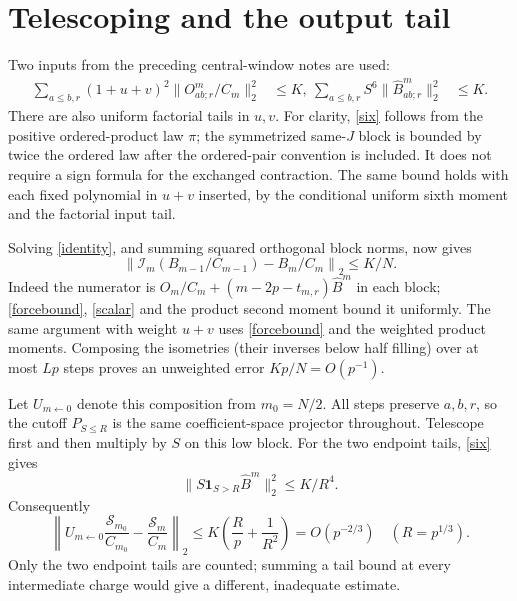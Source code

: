 \documentclass[11pt,a4paper]{article}
\newcommand{\Id}{\mathcal I}
\begin{document}
\newpage
\section{Telescoping and the output tail}
Two inputs from the preceding central-window notes are used:
\begin{align}
 \sum_{a\le b,r}(1+u+v)^2\|O^m_{ab;r}/C_m\|_2^2&\le K,\label{forcebound}\
 \sum_{a\le b,r}S^6\|\widehat B^m_{ab;r}\|_2^2&\le K.\label{six}
\end{align}
There are also uniform factorial tails in $u,v$. For clarity,
\eqref{six} follows from the positive ordered-product law $\pi$;
the symmetrized same-$J$ block is bounded by twice the ordered
law after the ordered-pair convention is included. It does not
require a sign formula for the exchanged contraction. The same
bound holds with each fixed polynomial in $u+v$ inserted, by the
conditional uniform sixth moment and the factorial input tail.

Solving \eqref{identity}, and summing squared orthogonal block norms,
now gives
\begin{equation}
 \left\|\Id_m(B_{m-1}/C_{m-1})-B_m/C_m\right\|_2\le K/N.
 \label{step}
\end{equation}
Indeed the numerator is $O_m/C_m+(m-2p-t_{m,r})\widehat B^m$
in each block; \eqref{forcebound}, \eqref{scalar} and the product
second moment bound it uniformly. The same argument with weight
$u+v$ uses \eqref{forcebound} and the weighted product moments.
Composing the isometries (their inverses below half filling) over
at most $Lp$ steps proves an unweighted error $Kp/N=O(p^{-1})$.

Let $U_{m\leftarrow0}$ denote this composition from $m_0=N/2$.
All steps preserve $a,b,r$, so the cutoff $P_{S\le R}$ is the same
coefficient-space projector throughout. Telescope first and then
multiply by $S$ on this low block. For the two endpoint tails,
\eqref{six} gives
\begin{equation}
 \|S\mathbf1_{S>R}\widehat B^m\|_2^2\le K/R^4.
\end{equation}
Consequently
\begin{equation}
 \left\|U_{m\leftarrow0}\frac{\mathcal S_{m_0}}{C_{m_0}}
                   -\frac{\mathcal S_m}{C_m}\right\|_2
 \le K\left(\frac R p+\frac1{R^2}\right)
 =O(p^{-2/3})\quad(R=p^{1/3}).\label{transport}
\end{equation}
Only the two endpoint tails are counted; summing a tail bound at
every intermediate charge would give a different, inadequate estimate.
\end{document}
